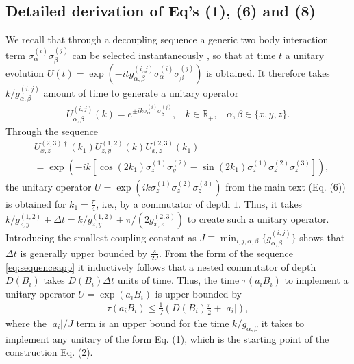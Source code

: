 \documentclass[aps,twocolumn,amsmath,amssymb,nofootinbib,superscriptaddress]{revtex4-1}
\begin{document}
\subsection*{Detailed derivation of Eq's (1), (6) and (8)}
We recall that through a decoupling sequence a generic two body interaction term $\sigma_{\alpha}^{(i)}\sigma_{\beta}^{(j)}$ can be selected instantaneously \cite{DecLloyd}, so that at time $t$ a unitary evolution $U(t)=\exp(-itg_{\alpha,\beta}^{(i,j)}\sigma_{\alpha}^{(i)}\sigma_{\beta}^{(j)})$ is obtained. It therefore takes $k/g_{\alpha,\beta}^{(i,j)}$ amount of time to generate a unitary operator 
\begin{align}
U_{\alpha,\beta}^{(i,j)}(k)=e^{\pm ik \sigma_{\alpha}^{(i)}\sigma_{\beta}^{(j)}},~~~~k\in \mathbb R_{+},~~~~\alpha,\beta\in\{x,y,z\}.
\end{align}
Through the sequence 
   \begin{align}
 \label{eq:sequenceapp}
 &U_{x,z}^{(2,3)\dagger}\left(k_{1}\right)U_{z,y}^{(1,2)}(k)U_{x,z}^{(2,3)}\left(k_{1}\right)\nonumber\\
 &=\exp(-ik[\cos(2k_{1})\sigma_{z}^{(1)}\sigma_{y}^{(2)}-\sin(2k_{1})\sigma_{z}^{(1)}\sigma_{z}^{(2)}\sigma_{z}^{(3)}]),
 \end{align}
the unitary operator $U=\exp(ik\sigma_{z}^{(1)}\sigma_{z}^{(2)} \sigma_{z}^{(3)})$ from the main text (Eq. (6)) is obtained for $k_{1}=\frac{\pi}{4}$, i.e., by a commutator of depth $1$.  Thus, it takes $k/{g_{z,y}^{(1,2)}}+\Delta t=k/{g_{z,y}^{(1,2)}}+\pi/(2g_{x,z}^{(2,3)})$ to create such a unitary operator. Introducing the smallest coupling constant as $J\equiv \min_{i,j,\alpha,\beta}\{g_{\alpha,\beta}^{(i,j)}\}$ shows that $\Delta t$ is generally upper bounded by $\frac{\pi}{2J}$. From the form of the sequence \eqref{eq:sequenceapp} it inductively follows that a nested commutator of depth $D(B_{i})$ takes $D(B_{i})\Delta t$ units of time. Thus,  the time $\tau(a_{i}B_{i})$ to implement a unitary operator $U=\exp(a_{i}B_{i})$ is upper bounded by 
\begin{align}
\label{eq:taBapp}
\tau(a_{i}B_{i})\leq \frac{1}{J}\left(D(B_{i})\frac{\pi}{2}+|a_{i}|\right), 	
\end{align}
where the $|a_{i}|/J$ term is an upper bound for the time $k/g_{\alpha,\beta}$ it takes to implement any unitary of the form Eq. (1), which is the starting point of the construction Eq. (2). 
\end{document}
